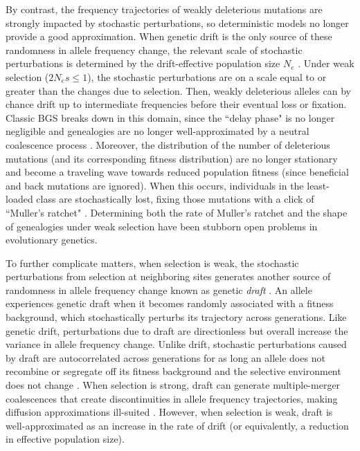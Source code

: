 \documentclass[11pt]{article}
\begin{document}
By contrast, the frequency trajectories of weakly deleterious mutations are
strongly impacted by stochastic perturbations, so deterministic models no
longer provide a good approximation. When genetic drift is the only source of
these randomness in allele frequency change, the relevant scale of stochastic
perturbations is determined by the drift-effective population size $N_e$
\parencite{Ohta1971-gq,Ohta1992-yi}. Under weak selection ($2N_e s \le 1$), the
stochastic perturbations are on a scale equal to or greater than the changes
due to selection. Then, weakly deleterious alleles can by chance drift up to
intermediate frequencies before their eventual loss or fixation. Classic BGS
breaks down in this domain, since the ``delay phase" is no longer negligible
and genealogies are no longer well-approximated by a neutral coalescence
process \parencite{Przeworski1999-mb,OFallon2010-my,Higgs1995-xc}. Moreover,
the distribution of the number of deleterious mutations (and its corresponding
fitness distribution) are no longer stationary and become a traveling wave
\parencite{Rouzine2008-qz,Good2013-lp,Gessler1995-hz} towards reduced
population fitness (since beneficial and back mutations are ignored). When this
occurs, individuals in the least-loaded class are stochastically lost, fixing
those mutations with a click of ``Muller's ratchet" \parencite{Muller1964-ki}.
Determining both the rate of Muller's ratchet
\parencite{Haigh1978-gt,Gordo2002-dr,Gessler1995-hz} and the shape of
genealogies under weak selection have been stubborn open problems in
evolutionary genetics. 

To further complicate matters, when selection is weak, the stochastic
perturbations from selection at neighboring sites generates another source of
randomness in allele frequency change known as genetic \emph{draft}
\parencite{Neher2013-dz}. An allele experiences genetic draft when it becomes
randomly associated with a fitness background, which stochastically perturbs
its trajectory across generations. Like genetic drift, perturbations due to
draft are directionless but overall increase the variance in allele frequency
change. Unlike drift, stochastic perturbations caused by draft are
autocorrelated across generations for as long an allele does not recombine or
segregate off its fitness background and the selective environment does not
change \parencite{Robertson1961-ho,Santiago1995-hx,Buffalo2019-qs}. When
selection is strong, draft can generate multiple-merger coalescences that
create discontinuities in allele frequency trajectories, making diffusion
approximations ill-suited \parencite{Gillespie2000-mh,Der2011-it,Neher2013-dz}.
However, when selection is weak, draft is well-approximated as an increase in
the rate of drift (or equivalently, a reduction in effective population size).
\end{document}
